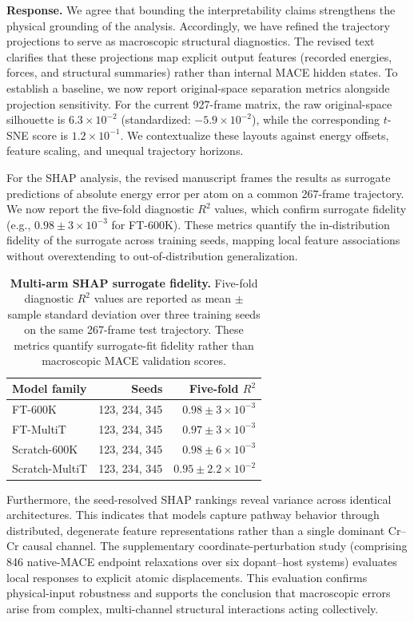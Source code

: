 \documentclass[11pt]{article}
\begin{document}
\textbf{Response.} 
We agree that bounding the interpretability claims strengthens the physical grounding of the analysis.
Accordingly, we have refined the trajectory projections to serve as macroscopic structural diagnostics. The revised text clarifies that these projections map explicit output features (recorded energies, forces, and structural summaries) rather than internal MACE hidden states. To establish a baseline, we now report original-space separation metrics alongside projection sensitivity. For the current 927-frame matrix, the raw original-space silhouette is $6.3\times10^{-2}$ (standardized: $-5.9\times10^{-2}$), while the corresponding $t$-SNE score is $1.2\times10^{-1}$. We contextualize these layouts against energy offsets, feature scaling, and unequal trajectory horizons.

For the SHAP analysis, the revised manuscript frames the results as surrogate predictions of absolute energy error per atom on a common 267-frame trajectory. We now report the five-fold diagnostic $R^2$ values, which confirm surrogate fidelity (e.g., $0.98\pm3\times10^{-3}$ for FT-600K). These metrics quantify the in-distribution fidelity of the surrogate across training seeds, mapping local feature associations without overextending to out-of-distribution generalization.

\begin{table}[!htbp]
\centering\small
\caption{\textbf{Multi-arm SHAP surrogate fidelity.} Five-fold diagnostic $R^2$ values are reported as mean $\pm$ sample standard deviation over three training seeds on the same 267-frame test trajectory. These metrics quantify surrogate-fit fidelity rather than macroscopic MACE validation scores.}
\label{tab:resp-a6-shap-fidelity}
\begin{tabular}{lrr}
\toprule
Model family & Seeds & Five-fold $R^2$ \\
\midrule
FT-600K & 123, 234, 345 & $0.98\pm3\times10^{-3}$ \\
FT-MultiT & 123, 234, 345 & $0.97\pm3\times10^{-3}$ \\
Scratch-600K & 123, 234, 345 & $0.98\pm6\times10^{-3}$ \\
Scratch-MultiT & 123, 234, 345 & $0.95\pm2.2\times10^{-2}$ \\
\bottomrule
\end{tabular}
\end{table}

Furthermore, the seed-resolved SHAP rankings reveal variance across identical architectures. This indicates that models capture pathway behavior through distributed, degenerate feature representations rather than a single dominant Cr--Cr causal channel. The supplementary coordinate-perturbation study (comprising 846 native-MACE endpoint relaxations over six dopant--host systems) evaluates local responses to explicit atomic displacements. This evaluation confirms physical-input robustness and supports the conclusion that macroscopic errors arise from complex, multi-channel structural interactions acting collectively.
\end{document}
